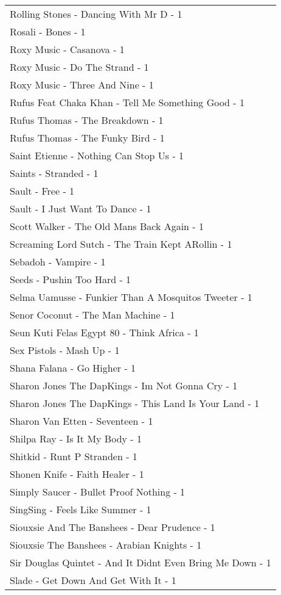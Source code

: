 \documentclass[
]{article}
\begin{document}
\begin{longtable}{l}
Rolling Stones - Dancing With Mr D - 1 \\ 
Rosali - Bones - 1 \\ 
Roxy Music - Casanova - 1 \\ 
Roxy Music - Do The Strand - 1 \\ 
Roxy Music - Three And Nine - 1 \\ 
Rufus Feat Chaka Khan - Tell Me Something Good - 1 \\ 
Rufus Thomas - The Breakdown - 1 \\ 
Rufus Thomas - The Funky Bird - 1 \\ 
Saint Etienne - Nothing Can Stop Us - 1 \\ 
Saints - Stranded - 1 \\ 
Sault - Free - 1 \\ 
Sault - I Just Want To Dance - 1 \\ 
Scott Walker - The Old Mans Back Again - 1 \\ 
Screaming Lord Sutch - The Train Kept ARollin - 1 \\ 
Sebadoh - Vampire - 1 \\ 
Seeds - Pushin Too Hard - 1 \\ 
Selma Uamusse - Funkier Than A Mosquitos Tweeter - 1 \\ 
Senor Coconut - The Man Machine - 1 \\ 
Seun Kuti Felas Egypt 80 - Think Africa - 1 \\ 
Sex Pistols - Mash Up - 1 \\ 
Shana Falana - Go Higher - 1 \\ 
Sharon Jones The DapKings - Im Not Gonna Cry - 1 \\ 
Sharon Jones The DapKings - This Land Is Your Land - 1 \\ 
Sharon Van Etten - Seventeen - 1 \\ 
Shilpa Ray - Is It My Body - 1 \\ 
Shitkid - Runt P Stranden - 1 \\ 
Shonen Knife - Faith Healer - 1 \\ 
Simply Saucer - Bullet Proof Nothing - 1 \\ 
SingSing - Feels Like Summer - 1 \\ 
Siouxsie And The Banshees - Dear Prudence - 1 \\ 
Siouxsie The Banshees - Arabian Knights - 1 \\ 
Sir Douglas Quintet - And It Didnt Even Bring Me Down - 1 \\ 
Slade - Get Down And Get With It - 1 \\ 

\end{longtable}
\end{document}
